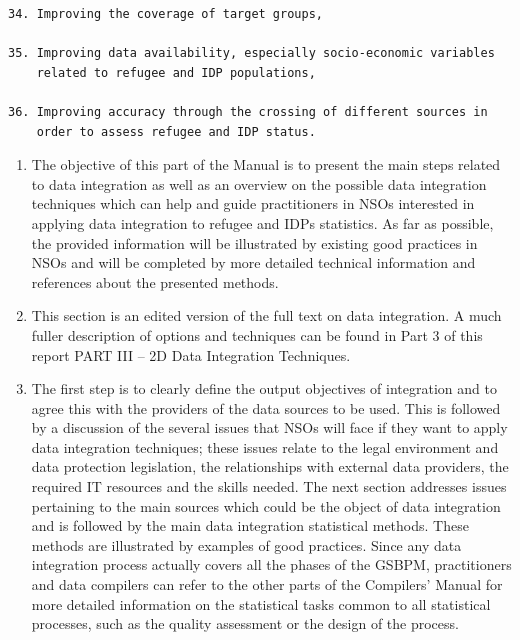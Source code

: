\documentclass[
]{article}
\begin{document}
\begin{verbatim}
34. Improving the coverage of target groups,

35. Improving data availability, especially socio-economic variables
    related to refugee and IDP populations,

36. Improving accuracy through the crossing of different sources in
    order to assess refugee and IDP status.
\end{verbatim}

\begin{enumerate}
\def\labelenumi{\arabic{enumi}.}
\setcounter{enumi}{197}
\item
  The objective of this part of the Manual is to present the main
  steps related to data integration as well as an overview on the
  possible data integration techniques which can help and guide
  practitioners in NSOs interested in applying data integration to
  refugee and IDPs statistics. As far as possible, the provided
  information will be illustrated by existing good practices in NSOs
  and will be completed by more detailed technical information and
  references about the presented methods.
\item
  This section is an edited version of the full text on data
  integration. A much fuller description of options and techniques can
  be found in Part 3 of this report PART III -- 2D Data Integration
  Techniques.
\item
  The first step is to clearly define the output objectives of
  integration and to agree this with the providers of the data sources
  to be used. This is followed by a discussion of the several issues
  that NSOs will face if they want to apply data integration
  techniques; these issues relate to the legal environment and data
  protection legislation, the relationships with external data
  providers, the required IT resources and the skills needed. The next
  section addresses issues pertaining to the main sources which could
  be the object of data integration and is followed by the main data
  integration statistical methods. These methods are illustrated by
  examples of good practices. Since any data integration process
  actually covers all the phases of the GSBPM, practitioners and data
  compilers can refer to the other parts of the Compilers' Manual for
  more detailed information on the statistical tasks common to all
  statistical processes, such as the quality assessment or the design
  of the process.
\end{enumerate}
\end{document}
